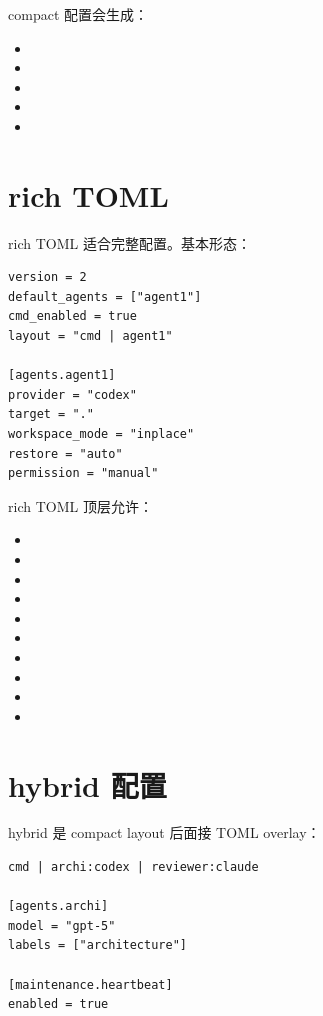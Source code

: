 compact 配置会生成：

\begin{itemize}
  \item {}
  \item {}
  \item {}
  \item {}
  \item {}
\end{itemize}

\section{rich TOML}

rich TOML 适合完整配置。基本形态：

\begin{lstlisting}
version = 2
default_agents = ["agent1"]
cmd_enabled = true
layout = "cmd | agent1"

[agents.agent1]
provider = "codex"
target = "."
workspace_mode = "inplace"
restore = "auto"
permission = "manual"
\end{lstlisting}

rich TOML 顶层允许：

\begin{itemize}
  \item {}
  \item {}
  \item {}
  \item {}
  \item {}
  \item {}
  \item {}
  \item {}
  \item {}
  \item {}
\end{itemize}

\section{hybrid 配置}

hybrid 是 compact layout 后面接 TOML overlay：

\begin{lstlisting}
cmd | archi:codex | reviewer:claude

[agents.archi]
model = "gpt-5"
labels = ["architecture"]

[maintenance.heartbeat]
enabled = true
\end{lstlisting}

